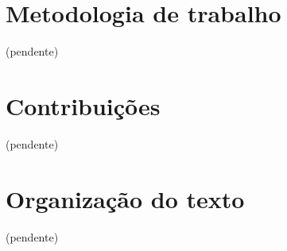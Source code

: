 
\section{Metodologia de trabalho}

(pendente)

\section{Contribuições}

(pendente)

\section{Organização do texto}

(pendente)
